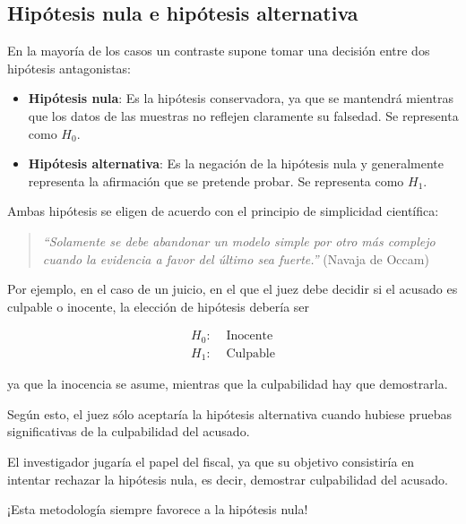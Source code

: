 \documentclass[
  spanish,
  a4paper,
]{scrreport}
\theoremstyle{plain}
\theoremstyle{definition}
\theoremstyle{definition}
\theoremstyle{remark}
\begin{document}
\subsection{Hipótesis nula e hipótesis
alternativa}\label{hipuxf3tesis-nula-e-hipuxf3tesis-alternativa}

En la mayoría de los casos un contraste supone tomar una decisión entre
dos hipótesis antagonistas:

\begin{itemize}
\item
  \textbf{Hipótesis nula}: Es la hipótesis conservadora, ya que se
  mantendrá mientras que los datos de las muestras no reflejen
  claramente su falsedad. Se representa como \(H_0\).
\item
  \textbf{Hipótesis alternativa}: Es la negación de la hipótesis nula y
  generalmente representa la afirmación que se pretende probar. Se
  representa como \(H_1\).
\end{itemize}

Ambas hipótesis se eligen de acuerdo con el principio de simplicidad
científica:

\begin{quote}
\emph{``Solamente se debe abandonar un modelo simple por otro más
complejo cuando la evidencia a favor del último sea fuerte.''} (Navaja
de Occam)
\end{quote}

Por ejemplo, en el caso de un juicio, en el que el juez debe decidir si
el acusado es culpable o inocente, la elección de hipótesis debería ser

\begin{align*}
H_0: & \mbox{ Inocente} \\
H_1: & \mbox{ Culpable}
\end{align*}

ya que la inocencia se asume, mientras que la culpabilidad hay que
demostrarla.

Según esto, el juez sólo aceptaría la hipótesis alternativa cuando
hubiese pruebas significativas de la culpabilidad del acusado.

El investigador jugaría el papel del fiscal, ya que su objetivo
consistiría en intentar rechazar la hipótesis nula, es decir, demostrar
culpabilidad del acusado.

\begin{tcolorbox}[enhanced jigsaw, arc=.35mm, bottomrule=.15mm, bottomtitle=1mm, breakable, colback=white, colbacktitle=quarto-callout-warning-color!10!white, colframe=quarto-callout-warning-color-frame, coltitle=black, left=2mm, leftrule=.75mm, opacityback=0, opacitybacktitle=0.6, rightrule=.15mm, title=\textcolor{quarto-callout-warning-color}{\faExclamationTriangle}\hspace{0.5em}{Advertencia}, titlerule=0mm, toprule=.15mm, toptitle=1mm]

¡Esta metodología siempre favorece a la hipótesis nula!

\end{tcolorbox}
\end{document}
